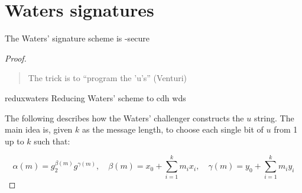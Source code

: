\section{Waters signatures}
\begin{theorem}
    The Waters' signature scheme is \ufcma-secure
\end{theorem}

\begin{proof}
    \begin{quote}
        The trick is to ``program the 'u's'' (Venturi)
    \end{quote}



    \begin{cryptoredux}
        {reduxwaters}
        {Reducing Waters' scheme to \cdh}
        {cdh}
        {wds}

        \cseqdelay


        \cseqdelay

        
        \cseqdelay
        \cseqdelay

        
    \end{cryptoredux}


    The following describes how the Waters' challenger constructs the $u$ string. The main idea is, given $k$ as the message length, to choose each single bit of $u$ from 1 up to $k$ such that:

    \begin{equation*}
        \alpha(m) = g_2^{\beta(m)}g^{\gamma(m)},\quad \beta(m) = x_0 + \sum_{i=1}^{k}m_ix_i,\quad \gamma(m) = y_0 + \sum_{i=1}^{k}m_iy_i
    \end{equation*}


\end{proof}
